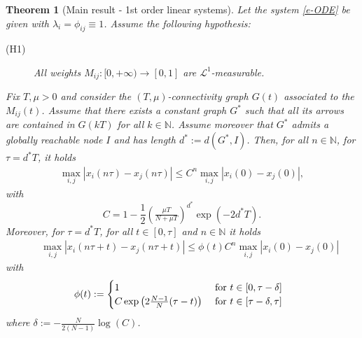 \documentclass[journal]{article}
\newcommand{\N}{\mathbb{N}}
\newtheorem{theorem}{Theorem}
\begin{document}
\begin{theorem}[Main result - 1st order linear systems] \label{t-main} Let the system \eqref{e-ODE} be given with $\lambda_i=\phi_{ij}\equiv 1$. Assume the following hypothesis:
\begin{description}
\item[(H1) \label{hyp:M}] All weights $M_{ij}:[0,+\infty)\to [0,1]$ are 
$\mathscr{L}^1$-measurable.
\end{description}

Fix $T,\mu>0$ and consider the $(T,\mu)$-connectivity graph $G(t)$ associated to the $M_{ij}(t)$. Assume that there exists a constant graph $G^*$ such that all its arrows are contained in $G(kT)$ for all $k\in\N$. Assume moreover that $G^*$ admits a globally reachable node $I$ and has length $d^*:=d(G^*,I)$. Then, for all $n\in\mathbb{N}$, for $\tau=d^*T$, it  holds
\begin{eqnarray}
\label{diam-est-ntau}
\max_{i,j}|x_i(n\tau)-x_j(n\tau)|\leq C^n \max_{i,j}|x_i(0)-x_j(0)|,\label{e-stimadiamThm}
\end{eqnarray}
with 
\begin{equation}
C=1-\frac12\left( \tfrac{\mu T}{N+\mu T}    \right)^{d^*}\exp(-2d^*T). \label{e-C}
\end{equation}
Moreover, for $\tau=d^*T$, for all $t\in[0,\tau]$ and $n\in\mathbb{N}$ it holds
\begin{eqnarray}
&&\max_{i,j}|x_i(n\tau+t)-x_j(n\tau+t)|\leq \phi(t) C^n\max_{i,j}|x_i(0)-x_j(0)|\label{e-stimaexp}
\end{eqnarray}
with
\begin{eqnarray*}
\hspace{-6mm}&&\phi(t):= \begin{cases}
1&~\mbox{for $t\in[0,\tau-\delta]$}\\
C\exp\left(2\frac{N-1}N(\tau-t)\right)&~\mbox{for $t\in[\tau-\delta,\tau]$}
\end{cases}
\end{eqnarray*}
where $\delta:=-\frac{N}{2(N-1)}\log(C)$.
\end{theorem}
\end{document}
